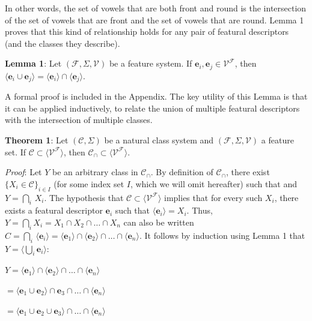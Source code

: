 \documentclass[11pt, oneside]{article}   	%
\begin{document}
In other words, the set of vowels that are both front and round is the intersection of the set of vowels that are front and the set of vowels that are round. Lemma 1 proves that this kind of relationship holds for any pair of featural descriptors (and the classes they describe).

\vspace{\baselineskip} \noindent \textbf{Lemma 1}: Let $(\mathcal F, \Sigma, \mathcal V)$ be a feature system. If $\mathbf{e}_i, \mathbf{e}_j \in \mathcal V^\mathcal F$, then $\langle \mathbf{e}_i \cup \mathbf{e}_j \rangle =  \langle \mathbf{e}_i \rangle \cap \langle \mathbf{e}_j \rangle$.

\vspace{\baselineskip} \noindent A formal proof is included in the Appendix. The key utility of this Lemma is that it can be applied inductively, to relate the union of multiple featural descriptors with the intersection of multiple classes.

\vspace{\baselineskip} \noindent \textbf{Theorem 1}: Let $(\mathcal C, \Sigma)$ be a natural class system and $(\mathcal F, \Sigma, \mathcal V)$ a feature set. If $\mathcal C \subset \langle \mathcal V^\mathcal F \rangle$, then $\mathcal C_\cap \subset\langle \mathcal V^\mathcal F \rangle $.

\textit{Proof}: Let $Y$ be an arbitrary class in $\mathcal C_\cap$. By definition of $\mathcal C_\cap$, there exist $\{X_i \in \mathcal C\}_{i \in I}$ (for some index set $I$, which we will omit hereafter) such that and $Y = \bigcap_i \, X_i$. The hypothesis that $\mathcal C \subset \langle \mathcal V^\mathcal F \rangle $ implies that for every such $X_i$, there exists a featural descriptor $\mathbf{e}_i$ such that $\langle \mathbf{e}_i \rangle = X_i$. Thus, $Y = \bigcap_i X_i = X_1 \cap X_2 \cap \ldots \cap X_n$ can also be written $C = \bigcap_i \, \langle \mathbf{e}_i \rangle = \langle \mathbf{e}_1 \rangle \cap \langle \mathbf{e}_2 \rangle \cap \ldots \cap \langle \mathbf{e}_n \rangle$. It follows by induction using Lemma 1 that $Y = \langle \bigcup_i \mathbf{e}_i \rangle$:

$Y = \langle \mathbf{e}_1 \rangle \cap  \langle \mathbf{e}_2 \rangle \cap \ldots \cap  \langle \mathbf{e}_n \rangle$

\quad $ = \langle \mathbf{e}_1 \cup \mathbf{e}_2 \rangle \cap \mathbf{e}_3 \cap \ldots \cap \langle \mathbf{e}_n \rangle$

\quad $ = \langle \mathbf{e}_1 \cup \mathbf{e}_2 \cup \mathbf{e}_3 \rangle \cap \ldots \cap \langle \mathbf{e}_n \rangle$
\end{document}
